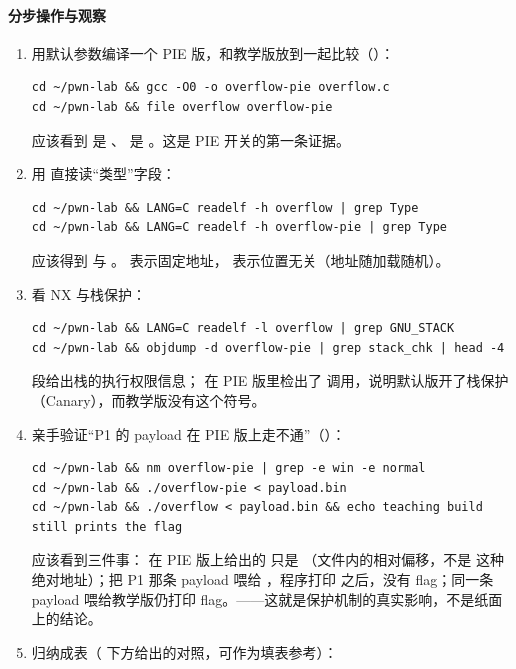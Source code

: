 \documentclass[UTF8,12pt,oneside]{ctexbook}
\begin{document}
\paragraph{分步操作与观察}
\begin{enumerate}[label=\arabic*.]
\item 用默认参数编译一个 PIE 版，和教学版放到一起比较（）：
\begin{lstlisting}
cd ~/pwn-lab && gcc -O0 -o overflow-pie overflow.c
cd ~/pwn-lab && file overflow overflow-pie
\end{lstlisting}
应该看到  是 、 是 。这是 PIE 开关的第一条证据。
\item 用  直接读“类型”字段：
\begin{lstlisting}
cd ~/pwn-lab && LANG=C readelf -h overflow | grep Type
cd ~/pwn-lab && LANG=C readelf -h overflow-pie | grep Type
\end{lstlisting}
应该得到  与 。 表示固定地址， 表示位置无关（地址随加载随机）。
\item 看 NX 与栈保护：
\begin{lstlisting}
cd ~/pwn-lab && LANG=C readelf -l overflow | grep GNU_STACK
cd ~/pwn-lab && objdump -d overflow-pie | grep stack_chk | head -4
\end{lstlisting}
 段给出栈的执行权限信息； 在 PIE 版里检出了  调用，说明默认版开了栈保护（Canary），而教学版没有这个符号。
\item 亲手验证“P1 的 payload 在 PIE 版上走不通”（）：
\begin{lstlisting}
cd ~/pwn-lab && nm overflow-pie | grep -e win -e normal
cd ~/pwn-lab && ./overflow-pie < payload.bin
cd ~/pwn-lab && ./overflow < payload.bin && echo teaching build still prints the flag
\end{lstlisting}
应该看到三件事： 在 PIE 版上给出的  只是 （文件内的相对偏移，不是  这种绝对地址）；把 P1 那条 payload 喂给 ，程序打印  之后，没有 flag；同一条 payload 喂给教学版仍打印 flag。——这就是保护机制的真实影响，不是纸面上的结论。
\item 归纳成表（ 下方给出的对照，可作为填表参考）：
\end{enumerate}
\end{document}
